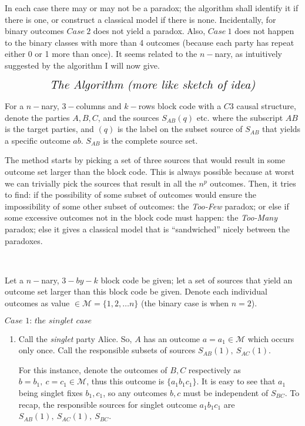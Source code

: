 \documentclass[12pt]{article}  %
\begin{document}
\begin{enumerate}
In each case there may or may not be a paradox; the algorithm shall identify it if there is one, or construct a classical model if there is none. Incidentally, for binary outcomes $Case \ 2$ does not yield a paradox. Also, $Case \ 1$ does not happen to the binary classes with more than 4 outcomes (because each party has repeat either 0 or 1 more than once). It seems related to the $n-$nary, as intuitively suggested by the algorithm I will now give.



$$\Large \textit{The Algorithm (more like sketch of idea)}$$

For a $n-$nary, $3-$columns and $k-$rows block code with a $C3$ causal structure, denote the parties $A,B,C$, and the sources $S_{AB}(q)$ etc. where the subscript $AB$ is the target parties, and $(q)$ is the label on the subset source of $S_{AB}$ that yields a specific outcome $ab$. $S_{AB}$ is the complete source set.


The method starts by picking a set of three sources that would result in some outcome set larger than the block code. This is always possible because at worst we can trivially pick the sources that result in all the $n^p$ outcomes. Then, it tries to find: if the possibility of some subset of outcomes would ensure the impossibility of some other subset of outcomes: the \textit{Too-Few} paradox; or else if some excessive outcomes not in the block code must happen: the \textit{Too-Many} paradox; else it gives a classical model that is ``sandwiched'' nicely between the paradoxes.

\

Let a $n-$nary, $3-by-k$ block code be given; let a set of sources that yield an outcome set larger than this block code be given. Denote each individual outcomes as value $\in \mathcal{M} = \{1, 2, \dots n\}$ (the binary case is when $n=2$).


$\textit{Case 1: the singlet case}$

\begin{enumerate}
\item Call the \textit{singlet} party Alice. So, $A$ has an outcome $a=a_1 \in \mathcal{M}$ which occurs only once. Call the responsible subsets of sources $S_{AB}(1), \ S_{AC}(1)$.


For this instance, denote the outcomes of $B,C$ respectively as $b=b_1, \ c=c_1 \in \mathcal{M}$, thus this outcome is $\{a_1 b_1 c_1\}$. It is easy to see that $a_1$ being singlet fixes $b_1, c_1$, so any outcomes $b,c$ must be independent of $S_{BC}$. To recap, the responsible sources for singlet outcome $a_1 b_1 c_1$ are $S_{AB}(1), \ S_{AC}(1), \ S_{BC}$.



\end{enumerate}
\end{enumerate}
\end{document}
